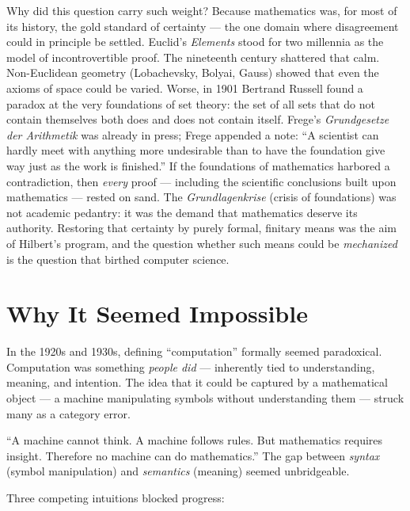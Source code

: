 Why did this question carry such weight? Because mathematics was, for most of its history, the gold standard of certainty --- the one domain where disagreement could in principle be settled. Euclid's \emph{Elements} stood for two millennia as the model of incontrovertible proof. The nineteenth century shattered that calm. Non-Euclidean geometry (Lobachevsky, Bolyai, Gauss) showed that even the axioms of space could be varied. Worse, in 1901 Bertrand Russell found a paradox at the very foundations of set theory: the set of all sets that do not contain themselves both does and does not contain itself. Frege's \emph{Grundgesetze der Arithmetik} was already in press; Frege appended a note: ``A scientist can hardly meet with anything more undesirable than to have the foundation give way just as the work is finished.'' If the foundations of mathematics harbored a contradiction, then \emph{every} proof --- including the scientific conclusions built upon mathematics --- rested on sand. The \emph{Grundlagenkrise} (crisis of foundations) was not academic pedantry: it was the demand that mathematics deserve its authority. Restoring that certainty by purely formal, finitary means was the aim of Hilbert's program, and the question whether such means could be \emph{mechanized} is the question that birthed computer science.

\section{Why It Seemed Impossible}
\label{sec:computation:impossible}

In the 1920s and 1930s, defining ``computation'' formally seemed paradoxical. Computation was something \emph{people did} --- inherently tied to understanding, meaning, and intention. The idea that it could be captured by a mathematical object --- a machine manipulating symbols without understanding them --- struck many as a category error.

``A machine cannot think. A machine follows rules. But mathematics requires insight. Therefore no machine can do mathematics.'' The gap between \emph{syntax} (symbol manipulation) and \emph{semantics} (meaning) seemed unbridgeable.

Three competing intuitions blocked progress:


